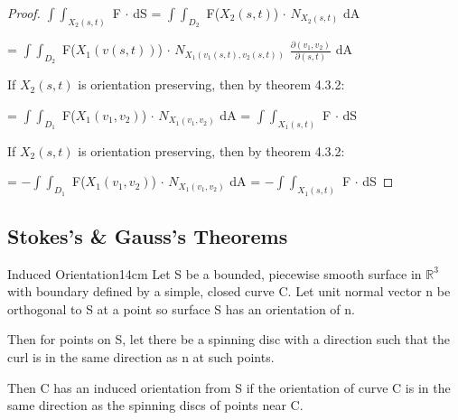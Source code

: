     \begin{proof}
        $\int \int_{X_2(s,t)}$ F $\cdot$ dS
        = $\int \int_{D_2}$ F($X_2(s,t)$) $\cdot$ $N_{X_2(s,t)}$ dA

        \hspace{2.75cm}
        = $\int \int_{D_2}$ F($X_1(v(s,t))$)
                            $\cdot$ $N_{X_1(v_1(s,t),v_2(s,t))}$
                            $\frac{\partial(v_1,v_2)}{\partial(s,t)}$ dA

        If $X_2(s,t)$ is orientation preserving,
        then by {\color{red} theorem 4.3.2}:

        \hspace{2.75cm}
        = $\int \int_{D_1}$ F($X_1(v_1,v_2)$)
                            $\cdot$ $N_{X_1(v_1,v_2)}$ dA
        = $\int \int_{X_1(s,t)}$ F $\cdot$ dS

        If $X_2(s,t)$ is orientation preserving,
        then by {\color{red} theorem 4.3.2}:

        \hspace{2.75cm}
        = $-\int \int_{D_1}$ F($X_1(v_1,v_2)$)
                            $\cdot$ $N_{X_1(v_1,v_2)}$ dA
        = $-\int \int_{X_1(s,t)}$ F $\cdot$ dS
    \end{proof}

    \newpage





\subsection{ Stokes's \& Gauss's Theorems }

    \begin{definition}{Induced Orientation}{14cm}
        Let S be a bounded, piecewise smooth surface in $\mathbb{R}^3$
        with boundary defined by a simple, closed curve C.
        Let unit normal vector n be orthogonal to S at a point
        so surface S has an orientation of n.

        Then for points on S, let there be a spinning disc with a direction
        such that the curl is in the same direction as n at such points.

        Then C has an {\color{lblue} induced orientation} from S
        if the orientation of curve C is in the same direction as
        the spinning discs of points near C.
    \end{definition}

    \vspace{0.5cm}



